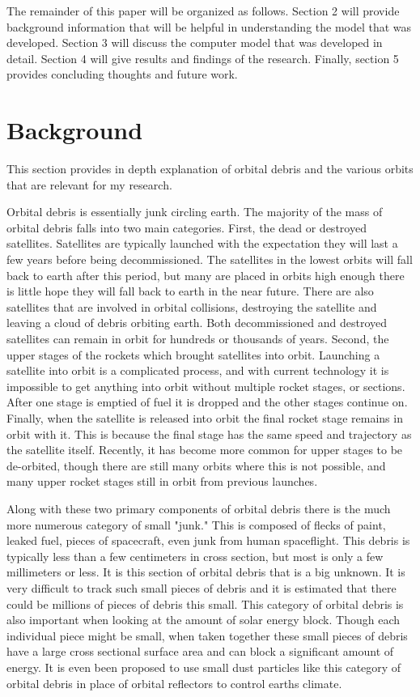 \documentclass[11pt]{article}
\begin{document}
\begin{multicols*}{2}
The remainder of this paper will be organized as follows. Section 2 will provide background information that will be helpful in understanding the model that was developed. Section 3 will discuss the computer model that was developed in detail. Section 4 will give results and findings of the research. Finally, section 5 provides concluding thoughts and future work.

\section{Background} \label{complexity_explaintion}
This section provides in depth explanation of orbital debris and the various orbits that are relevant for my research.

Orbital debris is essentially junk circling earth.\cite{nasa} The majority of the mass of orbital debris falls into two main categories. First, the dead or destroyed satellites. Satellites are typically launched with the expectation they will last a few years before being decommissioned. The satellites in the lowest orbits will fall back to earth after this period, but many are placed in orbits high enough there is little hope they will fall back to earth in the near future. There are also satellites that are involved in orbital collisions, destroying the satellite and leaving a cloud of debris orbiting earth. Both decommissioned and destroyed satellites can remain in orbit for hundreds or thousands of years. Second, the upper stages of the rockets which brought satellites into orbit. Launching a satellite into orbit is a complicated process, and with current technology it is impossible to get anything into orbit without multiple rocket stages, or sections. After one stage is emptied of fuel it is dropped and the other stages continue on. Finally, when the satellite is released into orbit the final rocket stage remains in orbit with it. This is because the final stage has the same speed and trajectory as the satellite itself. Recently, it has become more common for upper stages to be de-orbited, though there are still many orbits where this is not possible, and many upper rocket stages still in orbit from previous launches.

Along with these two primary components of orbital debris there is the much more numerous category of small "junk." This is composed of flecks of paint, leaked fuel, pieces of spacecraft, even junk from human spaceflight. This debris is typically less than a few centimeters in cross section, but most is only a few millimeters or less. It is this section of orbital debris that is a big unknown. It is very difficult to track such small pieces of debris and it is estimated that there could be millions of pieces of debris this small.\cite{nasa} This category of orbital debris is also important when looking at the amount of solar energy block. Though each individual piece might be small, when taken together these small pieces of debris have a large cross sectional surface area and can block a significant amount of energy. It is even been proposed to use small dust particles like this category of orbital debris in place of orbital reflectors to control earths climate. \cite{dust}




\end{multicols*}
\end{document}
